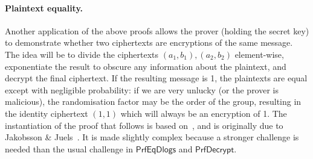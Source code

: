 \documentclass[12pt,a4paper]{article}
\theoremstyle{definition}
\begin{document}
\paragraph{Plaintext equality.}
Another application of the above proofs allows the prover (holding the secret key) to demonstrate whether two ciphertexts are encryptions of the same message. The idea will be to divide the ciphertexts $(a_1, b_1), (a_2, b_2)$ element-wise, exponentiate the result to obscure any information about the plaintext, and decrypt the final ciphertext. If the resulting message is 1, the plaintexts are equal except with negligible probability: if we are very unlucky (or the prover is malicious), the randomisation factor may be the order of the group, resulting in the identity ciphertext $(1, 1)$ which will always be an encryption of 1. The instantiation of the proof that follows is based on~\cite{mcmurtry2020test}, and is originally due to Jakobsson \& Juels~\cite{jakobsson2000mix}. It is made slightly complex because a stronger challenge is needed than the usual challenge in $\mathsf{PrfEqDlogs}$ and $\mathsf{PrfDecrypt}$.
\end{document}
